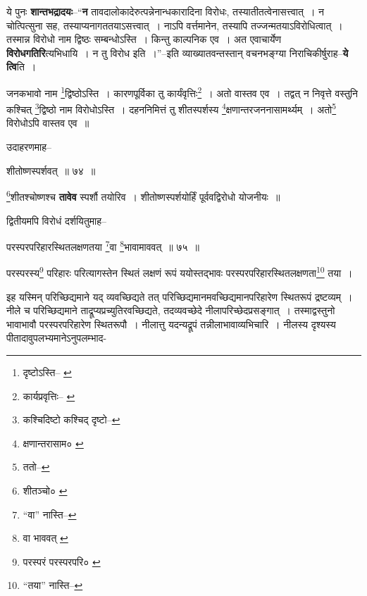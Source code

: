 \documentclass[article,12pt,a4paper]{memoir}
\begin{document}
	  \pstart ये पुनः \textbf{शान्तभद्रादयः}--“\textbf{न} तावदालोकादेरुत्पन्नेनान्धकारादिना विरोधः, तस्यातीतत्वेनासत्त्वात् । न चोत्पित्सुना सह, तस्याप्यनागततयाऽसत्त्वात् । नाऽपि वर्त्तमानेन, तस्यापि तज्जन्मतयाऽविरोधित्वात् । तस्मान्न विरोधो नाम द्विष्ठः सम्बन्धोऽस्ति । किन्तु काल्पनिक एव । अत एवाचार्येण \textbf{विरोधगतिरि}त्यभिधायि । न तु विरोध इति ।”--इति व्याख्यातवन्तस्तान् वचनभङ्ग्या निराचिकीर्षुराह--\textbf{ये त्वि}ति ।
	\pend
	  \bigskip
	  \begingroup
	

	  \pstart जनकभावो नाम \footnote{दृष्टोऽस्ति--\cite{dp-msA} \cite{dp-msB} \cite{dp-edP} \cite{dp-edH} \cite{dp-edE} \cite{dp-edN}}\-द्विष्ठोऽस्ति । कारणपूर्विका तु कार्यंवृत्तिः\footnote{कार्यप्रवृत्तिः--\cite{dp-msA} \cite{dp-msB} \cite{dp-msC} \cite{dp-msD} \cite{dp-edP} \cite{dp-edH} \cite{dp-edE} \cite{dp-edN}} । अतो वास्तव एव । तद्वत् न निवृत्ते वस्तुनि कश्चित् \footnote{कश्चिदिष्टो \cite{dp-msA} \cite{dp-msB} \cite{dp-edP} \cite{dp-edH} \cite{dp-edN} कश्चिद् दृष्टो--\cite{dp-edE}}\-द्विष्ठो नाम विरोधोऽस्ति । दहननिमित्तं तु शीतस्पर्शस्य \footnote{क्षणान्तरासाम० \cite{dp-msA} \cite{dp-msB} \cite{dp-edP} \cite{dp-edH} \cite{dp-edE} \cite{dp-edN}}\-क्षणान्तरजननासामर्थ्यम् । अतो\footnote{ततो--\cite{dp-msC}} विरोधोऽपि वास्तव एव ॥
	\pend
       

	  \pstart उदाहरणमाह--
	\pend
       
	  \bigskip
	  \begingroup
	

	  \pstart शीतोष्णस्पर्शवत् ॥ ७४ ॥
	\pend
      
	  \endgroup
	 

	  \pstart \footnote{शीतञ्चो० \cite{dp-msD}}\-शीतश्चोष्णश्च \textbf{तावेव} स्पर्शौ तयोरिव । शीतोष्णस्पर्शयोर्हिं पूर्ववद्विरोधो योजनीयः ॥
	\pend
       

	  \pstart द्वितीयमपि विरोधं दर्शयितुमाह--
	\pend
       
	  \bigskip
	  \begingroup
	

	  \pstart परस्परपरिहारस्थितलक्षणतया \footnote{“वा” नास्ति--\cite{dp-msC}}\-वा \footnote{वा भाववत् \cite{dp-msB} \cite{dp-edP} \cite{dp-edH}}\-भावामाववत् ॥ ७५ ॥
	\pend
      
	  \endgroup
	 

	  \pstart परस्परस्य\footnote{परस्परं \cite{dp-msA} \cite{dp-msB} \cite{dp-edP} परस्परपरि० \cite{dp-edH} \cite{dp-edE}} परिहारः परित्यागस्तेन स्थितं लक्षणं रूपं ययोस्तद्भावः परस्परपरिहारस्थितलक्षणता\footnote{“तया” नास्ति--\cite{dp-msC}} तया ।
	\pend
       

	  \pstart इह यस्मिन् परिच्छिद्यमाने यद् व्यवच्छिद्यते तत् परिच्छिद्यमानमवच्छिद्यमानपरिहारेण स्थितरूपं द्रष्टव्यम् । नीले च परिच्छिद्यमाने ताद्रूप्यप्रच्युतिरवच्छिद्यते, तदव्यवच्छेदे नीलापरिच्छेदप्रसङ्गात् । तस्माद्वस्तुनो भावाभावौ परस्परपरिहारेण स्थितरूपौ । नीलात्तु यदन्यद्रूपं तन्नीलाभावाव्यभिचारि । नीलस्य दृश्यस्य पीतादावुपलभ्यमानेऽनुपलम्भाद-
	\pend
      
\end{document}
